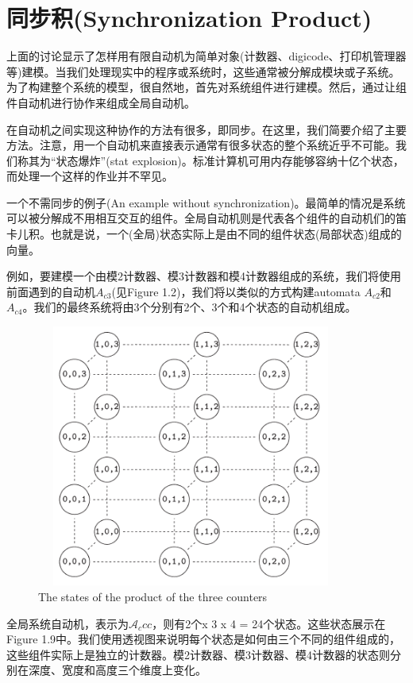 \documentclass{book}
\begin{document}
    \section{同步积(Synchronization Product)}
    上面的讨论显示了怎样用有限自动机为简单对象(计数器、digicode、打印机管理器等)建模。当我们处理现实中的程序或系统时，这些通常被分解成模块或子系统。为了构建整个系统的模型，很自然地，首先对系统组件进行建模。然后，通过让组件自动机进行协作来组成全局自动机。
    
    在自动机之间实现这种协作的方法有很多，即同步。在这里，我们简要介绍了主要方法。注意，用一个自动机来直接表示通常有很多状态的整个系统近乎不可能。我们称其为“状态爆炸”(stat explosion)。标准计算机可用内存能够容纳十亿个状态，而处理一个这样的作业并不罕见。
    
    一个不需同步的例子(An example without synchronization)。最简单的情况是系统可以被分解成不用相互交互的组件。全局自动机则是代表各个组件的自动机们的笛卡儿积。也就是说，一个(全局)状态实际上是由不同的组件状态(局部状态)组成的向量。
    
    例如，要建模一个由模2计数器、模3计数器和模4计数器组成的系统，我们将使用前面遇到的自动机$A_{c3}$(见Figure 1.2)，我们将以类似的方式构建automata $A_{c2}$和$A_{c4}$。我们的最终系统将由3个分别有2个、3个和4个状态的自动机组成。
    \begin{figure}
    \centering
    \includegraphics[height=3.4in,width=4.0in]{1_9.png}
    \caption{The states of the product of the three counters}
    \end{figure}
    全局系统自动机，表示为$\mathcal{A}_ccc$，则有2个x 3 x 4 = 24个状态。这些状态展示在Figure 1.9中。我们使用透视图来说明每个状态是如何由三个不同的组件组成的，这些组件实际上是独立的计数器。模2计数器、模3计数器、模4计数器的状态则分别在深度、宽度和高度三个维度上变化。
\end{document}
